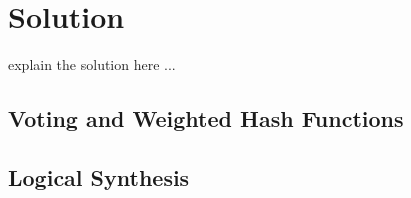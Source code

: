 \section{Solution}
\label{sec:solution}

explain the solution here ...

\subsection{Voting and Weighted Hash Functions}

\subsection{Logical Synthesis}
